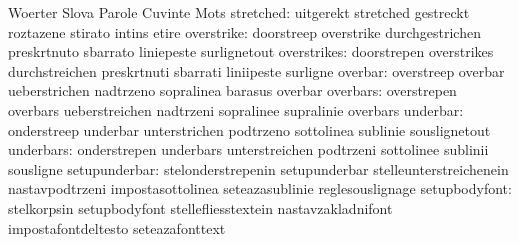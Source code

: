                                  Woerter                          Slova
                                  Parole                           Cuvinte
                                  Mots
                       stretched: uitgerekt                        stretched
                                  gestreckt                        roztazene
                                  stirato                          intins
                                  etire
                      overstrike: doorstreep                       overstrike
                                  durchgestrichen                  preskrtnuto
                                  sbarrato                         liniepeste
                                  surlignetout
                     overstrikes: doorstrepen                      overstrikes
                                  durchstreichen                   preskrtnuti
                                  sbarrati                         liniipeste
                                  surligne
                         overbar: overstreep                       overbar
                                  ueberstrichen                    nadtrzeno
                                  sopralinea                       barasus
                                  overbar
                        overbars: overstrepen                      overbars
                                  ueberstreichen                   nadtrzeni
                                  sopralinee                       supralinie
                                  overbars
                        underbar: onderstreep                      underbar
                                  unterstrichen                    podtrzeno
                                  sottolinea                       sublinie
                                  souslignetout
                       underbars: onderstrepen                     underbars
                                  unterstreichen                   podtrzeni
                                  sottolinee                       sublinii
                                  sousligne
                   setupunderbar: stelonderstrepenin               setupunderbar
                                  stelleunterstreichenein          nastavpodtrzeni
                                  impostasottolinea                seteazasublinie
                                  reglesouslignage
                   setupbodyfont: stelkorpsin                      setupbodyfont
                                  stellefliesstextein              nastavzakladnifont
                                  impostafontdeltesto              seteazafonttext
